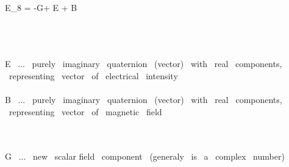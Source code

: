 \widehat E_8 = -G+\imath {} \widehat E + \widehat B

\\\\\\

\widehat E \ ... \ purely \ imaginary \ quaternion \ (vector) \ with  \ real \ components, \ representing \ vector \ of \ electrical \ intensity
\\\\
\widehat B \ ... \  purely \ imaginary \ quaternion \ (vector) \ with  \ real \ components, \ representing \ vector \ of \ magnetic \ field

\\\\
G \ ... \ new \ scalar field \ component \ (generaly \ is \ a \ complex \ number)
\\\\
